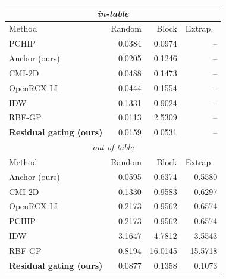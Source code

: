 \small
\begin{tabular}{lrrr}\toprule
\multicolumn{4}{c}{\emph{in-table}} \\\midrule
Method & Random & Block & Extrap.\ \\\midrule
PCHIP & 0.0384 & 0.0974 & -- \\
Anchor (ours) & 0.0205 & 0.1246 & -- \\
CMI-2D & 0.0488 & 0.1473 & -- \\
OpenRCX-LI & 0.0444 & 0.1554 & -- \\
IDW & 0.1331 & 0.9024 & -- \\
RBF-GP & 0.0113 & 2.5309 & -- \\
\textbf{Residual gating (ours)} & 0.0159 & 0.0531 & -- \\
\midrule\multicolumn{4}{c}{\emph{out-of-table}} \\\midrule
Method & Random & Block & Extrap.\ \\\midrule
Anchor (ours) & 0.0595 & 0.6374 & 0.5580 \\
CMI-2D & 0.1330 & 0.9583 & 0.6297 \\
OpenRCX-LI & 0.2173 & 0.9562 & 0.6574 \\
PCHIP & 0.2173 & 0.9562 & 0.6574 \\
IDW & 3.1647 & 4.7812 & 3.5543 \\
RBF-GP & 0.8194 & 16.0145 & 15.5718 \\
\textbf{Residual gating (ours)} & 0.0877 & 0.1358 & 0.1073 \\
\bottomrule\end{tabular}
